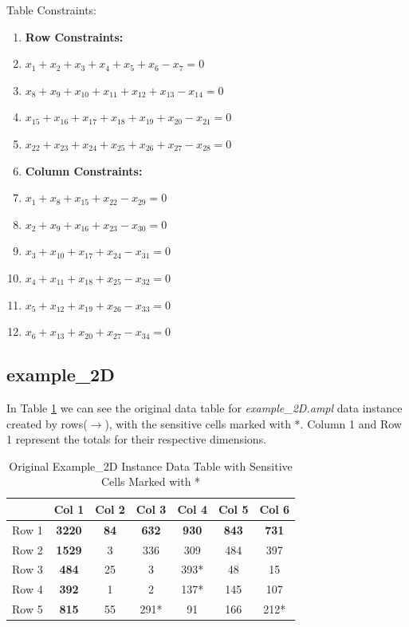 \documentclass[11pt,a4paper]{article}
\begin{document}
Table Constraints:
\begin{enumerate}
  \item[] \hspace*{-\leftmargin}\textbf{Row Constraints:}
  \item  $x_{1} + x_{2} + x_{3} + x_{4} + x_{5} + x_{6} - x_{7} = 0$
  \item  $x_{8} + x_{9} + x_{10} + x_{11} + x_{12} + x_{13} - x_{14} = 0$
  \item  $x_{15} + x_{16} + x_{17} + x_{18} + x_{19} + x_{20} - x_{21} = 0$
  \item  $x_{22} + x_{23} + x_{24} + x_{25} + x_{26} + x_{27} - x_{28} = 0$
  \item[] \hspace*{-\leftmargin}\textbf{Column Constraints:}
  \item  $x_{1} + x_{8} + x_{15} + x_{22} - x_{29} = 0$
  \item  $x_{2} + x_{9} + x_{16} + x_{23} - x_{30} = 0$
  \item  $x_{3} + x_{10} + x_{17} + x_{24} - x_{31} = 0$
  \item  $x_{4} + x_{11} + x_{18} + x_{25} - x_{32} = 0$
  \item  $x_{5} + x_{12} + x_{19} + x_{26} - x_{33} = 0$
  \item  $x_{6} + x_{13} + x_{20} + x_{27} - x_{34} = 0$
\end{enumerate}


\subsection{example\_2D}

In Table \ref{tab:example2D-original} we can see the original data table for \textit{example\_2D.ampl} data instance created by rows($\rightarrow$), with the sensitive cells marked with *.
Column 1 and Row 1 represent the totals for their respective dimensions.
\begin{table}[h]
    \centering
    \begin{tabular}{l | c c c c c c}
         & Col 1 & Col 2 & Col 3 & Col 4 & Col 5 & Col 6 \\
        \toprule
        Row 1     & \textbf{3220} & \textbf{84} & \textbf{632} & \textbf{930} & \textbf{843} & \textbf{731} \\
        Row 2     & \textbf{1529} & 3  & 336 & 309  & 484 & 397 \\
        Row 3     & \textbf{484}  & 25 & 3   & 393* & 48  & 15  \\
        Row 4     & \textbf{392}  & 1  & 2   & 137* & 145 & 107  \\
        Row 5     & \textbf{815}  & 55 & 291* & 91  & 166 & 212* \\
    \end{tabular}
    \caption{Original Example\_2D Instance Data Table with Sensitive Cells Marked with *}
    \label{tab:example2D-original}
\end{table}
\end{document}
